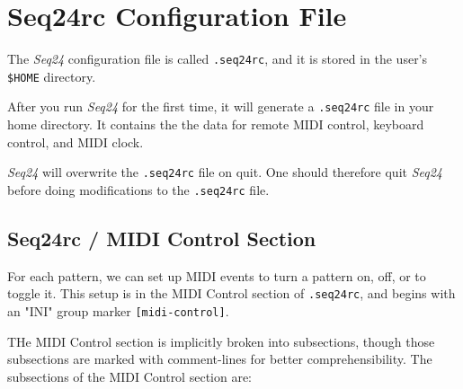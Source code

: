 %
%
%

\section{Seq24rc Configuration File}
\label{sec:seq24_rc_file}

   \index{[.seq24rc]}   %
   The \textsl{Seq24} configuration file is called
   \texttt{.seq24rc}, and it is stored in the user's \texttt{\$HOME}
   directory.

   After you run \textsl{Seq24} for the first time, it will generate a
   \texttt{.seq24rc} file in your home directory.
   It contains the the data for remote MIDI control, keyboard
   control, and MIDI clock.

   \textsl{Seq24} will overwrite the \texttt{.seq24rc} file on quit.  One
   should therefore quit \textsl{Seq24} before doing modifications to the
   \texttt{.seq24rc} file.

\subsection{Seq24rc / MIDI Control Section}
\label{subsec:seq24_rc_file_midi_control}

   For each pattern, we can set up MIDI events to turn a 
	pattern on, off, or to toggle it.  This setup is in the 
   MIDI Control section of \texttt{.seq24rc}, and begins with an
   "INI" group marker \texttt{[midi-control]}.
	
   THe MIDI Control section is implicitly broken into subsections, though those
   subsections are marked with comment-lines for better comprehensibility.
   The subsections of the MIDI Control section are:

